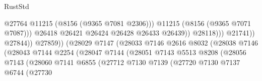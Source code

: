 \begin{lexlean}{RustStd}
\begin{coremodule}
{\begin{coremodule}
{{{{{{{{{{{{{{{{{{{{{{{{{{{{{{{{{{                                                              @27764
                                                              @11215
                                                              (@8156 (@9365 @7081 @2306)))
                                                            @11215
                                                            (@8156 (@9365 @7071 @7087)))
                                                          @26418
                                                          @26421
                                                          @26424
                                                          @26428
                                                          @26433
                                                          @26439))
                                                      @28118)))
                                                @21741))
                                            @27844))
                                        @27859))
                                    (@28029
                                      @7147
                                      (@28033
                                        @7146
                                        @2616
                                        @8032
                                        (@28038
                                          @7146
                                          (@28043
                                            @7144
                                            @2254
                                            (@28047
                                              @7144
                                              (@28051
                                                @7143
                                                @5513
                                                @8208
                                                (@28056
                                                  @7143
                                                  (@28060
                                                    @7141
                                                    @6855
                                                    (@27712
                                                      @7130
                                                      @7139
                                                      (@27720
                                                        @7130
                                                        @7137
                                                        @6744
                                                        (@27730
}}}}}}}}}}}}}}}}}}}}}}}}}}}}}}}}}}
\end{coremodule}}
\end{coremodule}
\end{lexlean}
